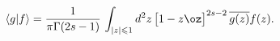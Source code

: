 \begin{equation}
\langle g|f\rangle=\frac{1}{\pi\Gamma(2s-1)}\,\int_{|z|\leqslant 1}
d^2z\,\bigl[1-z\oz\bigr]^{2s-2}\, \overline{g(z)}f(z).
\label{norm}
\end{equation}

